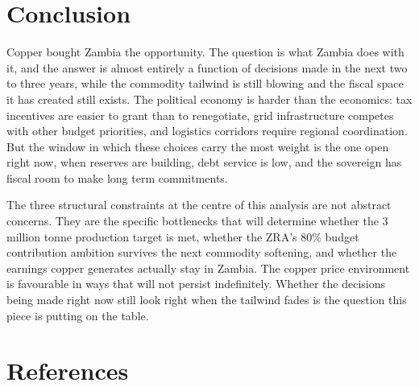 \documentclass[11pt,a4paper]{article}
\begin{document}
\section{Conclusion}

Copper bought Zambia the opportunity. The question is what Zambia does
with it, and the answer is almost entirely a function of decisions made
in the next two to three years, while the commodity tailwind is still
blowing and the fiscal space it has created still exists. The political
economy is harder than the economics: tax incentives are easier to grant
than to renegotiate, grid infrastructure competes with other budget
priorities, and logistics corridors require regional coordination. But the
window in which these choices carry the most weight is the one open right
now, when reserves are building, debt service is low, and the sovereign
has fiscal room to make long term commitments.

The three structural constraints at the centre of this analysis are not
abstract concerns. They are the specific bottlenecks that will determine
whether the 3 million tonne production target is met, whether the ZRA's
80\% budget contribution ambition survives the next commodity softening,
and whether the earnings copper generates actually stay in Zambia. The
copper price environment is favourable in ways that will not persist
indefinitely. Whether the decisions being made right now still look right
when the tailwind fades is the question this piece is putting on the table.

\section{References}
\end{document}
